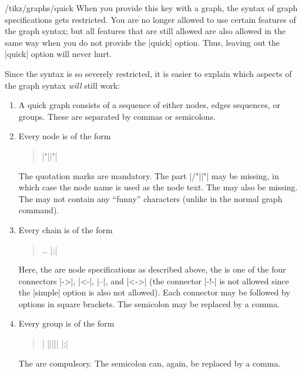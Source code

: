 \begin{key}{/tikz/graphs/quick}
  When you provide this key with a graph, the syntax of graph
  specifications gets restricted. You are no longer allowed to use
  certain features of the graph syntax; but all features that are
  still allowed are also allowed in the same way when you do not
  provide the |quick| option. Thus, leaving out the |quick| option
  will never hurt.

  Since the syntax is so severely restricted, it is easier to explain
  which aspects of the graph syntax \emph{will} still work:
  
  \begin{enumerate}
  \item 
    A quick graph consists of a sequence of either nodes, edges sequences, or
    groups. These are separated by commas or semicolons.
  \item  
    Every node is of the form
    
    \begin{quote}
      |"||"|
    \end{quote}

    The quotation marks are mandatory. The part |/"||"| may  be missing, in which case the node name is used as
    the node text. The  may also be missing. The
     may not contain any ``funny'' characters (unlike
    in the normal graph command).
  \item
    Every chain is of the form
    
    \begin{quote}
        
       \dots {} |;|
    \end{quote}

    Here, the  are node specifications as described
    above, the  is one of the four connectors |->|,
    |<-|, |--|, and |<->| (the connector |-!-| is not allowed since
    the |simple| option is also not allowed). Each connector may be
    followed by options in square brackets. The semicolon may be
    replaced by a comma. 
  \item
    Every group is of the form
    
    \begin{quote}
      |{ [||]|  |};|
    \end{quote}
    The  are compulsory. The semicolon can, again, be 
    replaced by a comma.
  \end{enumerate}


\end{key}
